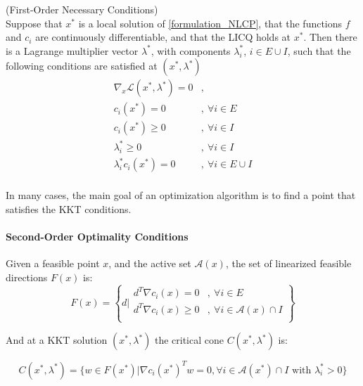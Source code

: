 \begin{theorem}(First-Order Necessary Conditions)\\
  \label{KKT_condition}
  Suppose that $x^*$ is a local solution of \ref{formulation_NLCP}, that the functions $f$ and $c_i$ are continuously differentiable, and that the LICQ holds at $x^*$.
  Then there is a Lagrange multiplier vector $\lambda^*$, with components $\lambda_i^*$, $i\in E\cup I$, such that the following conditions are satisfied at $(x^*,\lambda^*)$
  \begin{equation}
  \begin{array}{ll}
    \nabla_x\mathcal{L}(x^*,\lambda^*) = 0 &, \\
    c_i(x^*) = 0 &,\ \forall i\in E\\
    c_i(x^*) \geq 0 &,\ \forall i\in I\\
    \lambda_i^* \geq 0 &,\ \forall i\in I\\
    \lambda_i^* c_i(x^*)=0 &,\ \forall i \in E\cup I\\
  \end{array}
  \end{equation}
\end{theorem}

In many cases, the main goal of an optimization algorithm is to find a point that satisfies the KKT conditions.

\paragraph{Second-Order Optimality Conditions}

\begin{definition}
  Given a feasible point $x$, and the active set $\mathcal{A}(x)$, the  set of linearized feasible directions $F(x)$ is:
  \begin{equation}
    F(x)=\left\{d|
        \begin{array}{ll}
          d^T\nabla c_i(x) = 0&,\ \forall i\in E \\
          d^T\nabla c_i(x) \geq 0&,\ \forall i\in \mathcal{A}(x)\cap I \\
        \end{array}
    \right\}
  \end{equation}
\end{definition}

And at a KKT solution $(x^*,\lambda^*)$ the critical cone $C(x^*, \lambda^*)$ is:

\begin{equation}
  C(x^*,\lambda^*) = \{w\in F(x^*)|\nabla c_i(x^*)^Tw=0, \forall i\in\mathcal{A}(x^*)\cap I \text{ with } \lambda_i^*>0\}
\end{equation}

